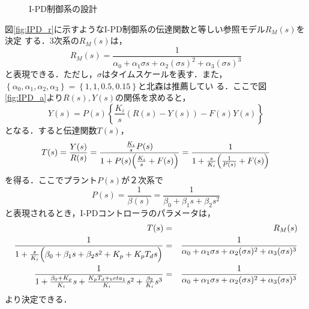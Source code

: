 \documentclass[a4paper,12pt]{jarticle}
\begin{document}
\begin{figure}[tbp]
  \begin{center} 
  \hfill
  \end{center}
  \caption{I-PD制御系の設計}
  \label{fig:IPD}
\end{figure}
%
図\ref{fig:IPD_r}に示すようなI-PD制御系の伝達関数と等しい参照モデル$R_M(s)$を決定
する．3次系の$R_M(s)$は，
%
\begin{equation}\label{equ:R_M}
 R_M(s) = \frac{1}{\alpha_0+\alpha_1\sigma s+\alpha_2 (\sigma s)^2+\alpha_3(\sigma s)^3}
\end{equation}
%
と表現できる．ただし，$\sigma$はタイムスケールを表す．また，
$\left\{\alpha_0,\alpha_1,\alpha_2,\alpha_3\right\}=\left\{1,1,0.5,0.15\right\}$と北森は推薦してい
る．ここで図\ref{fig:IPD_a}より$R(s),Y(s)$の関係を求めると，
%
\begin{equation}
 Y(s) = P(s)\left\{\frac{K_i}{s}(R(s)-Y(s))-F(s)Y(s) \right\}
\end{equation}
%
となる．すると伝達関数$T(s)$，
%
\begin{equation}
 T(s) = \frac{Y(s)}{R(s)} =
  \frac{\frac{K_i}{s}P(s)}{1+P(s)\Bigl(\frac{K_i}{s}+F(s)\Bigr)} =  \frac{1}{1+\frac{s}{K_i}\Bigl(\frac{1}{P(s)}+F(s)\Bigr)}
\end{equation}
%
を得る．ここでプラント$P(s)$が２次系で
%
\begin{equation}\label{equ:beta}
 P(s) = \frac{1}{\beta (s)} = \frac{1}{\beta_0 + \beta_1 s + \beta_2 s^2}
\end{equation}
%
と表現されるとき，I-PDコントローラのパラメータは，
%
\begin{eqnarray}
 T(s) & = & R_M(s) \nonumber \\
 \frac{1}{1+\frac{s}{K_i}\Bigl(\beta_0 + \beta_1 s + \beta_2 s^2 +
  K_p+K_p T_d s \Bigr)} & = & \frac{1}{\alpha_0+\alpha_1\sigma
  s+\alpha_2 (\sigma s)^2+\alpha_3(\sigma s)^3} \nonumber \\
 \frac{1}{1+\frac{\beta_0 + K_p}{K_i}s+\frac{K_pT_d+_beta_1}{K_i}s^2+\frac{\beta_2}{K_i}s^3}& = & \frac{1}{\alpha_0+\alpha_1\sigma s+\alpha_2 (\sigma s)^2+\alpha_3(\sigma s)^3}\label{equ:equal}
\end{eqnarray}
%
より決定できる．
%
\end{document}
